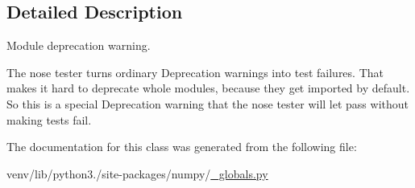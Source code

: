 \subsection{Detailed Description}
\begin{DoxyVerb}Module deprecation warning.

The nose tester turns ordinary Deprecation warnings into test failures.
That makes it hard to deprecate whole modules, because they get
imported by default. So this is a special Deprecation warning that the
nose tester will let pass without making tests fail.\end{DoxyVerb}
 

The documentation for this class was generated from the following file\+:\begin{DoxyCompactItemize}
\item 
venv/lib/python3./site-\/packages/numpy/\hyperlink{__globals_8py}{\+\_\+globals.\+py}\end{DoxyCompactItemize}
